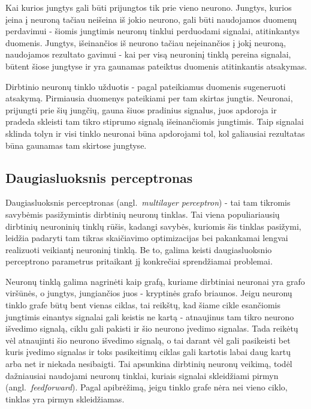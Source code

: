 \documentclass{VUMIFPSbakalaurinis}
\begin{document}
Kai kurios jungtys gali būti prijungtos tik prie vieno neurono.
Jungtys, kurios įeina į neuroną tačiau neišeina iš jokio neurono, gali būti naudojamos duomenų perdavimui - šiomis jungtimis neuronų tinklui perduodami signalai, atitinkantys duomenis.
Jungtys, išeinančios iš neurono tačiau neįeinančios į jokį neuroną, naudojamos rezultato gavimui - kai per visą neuroninį tinklą pereina signalai, būtent šiose jungtyse ir yra gaunamas pateiktus duomenis atitinkantis atsakymas.

Dirbtinio neuronų tinklo užduotis - pagal pateikiamus duomenis sugeneruoti atsakymą.
Pirmiausia duomenys pateikiami per tam skirtas jungtis.
Neuronai, prijungti prie šių jungčių, gauna šiuos pradinius signalus, juos apdoroja ir pradeda skleisti tam tikro stiprumo signalą išeinančiomis jungtimis.
Taip signalai sklinda tolyn ir visi tinklo neuronai būna apdorojami tol, kol galiausiai rezultatas būna gaunamas tam skirtose jungtyse.



\subsection{Daugiasluoksnis perceptronas}

Daugiasluoksnis perceptronas (angl.~\textit{multilayer perceptron}) - tai tam tikromis savybėmis pasižymintis dirbtinių neuronų tinklas.
Tai viena populiariausių dirbtinių neuroninių tinklų rūšis, kadangi savybės, kuriomis šis tinklas pasižymi, leidžia padaryti tam tikras skaičiavimo optimizacijas bei pakankamai lengvai realizuoti veikiantį neuroninį tinklą.
Be to, galima keisti daugiasluoksnio perceptrono parametrus pritaikant jį konkrečiai sprendžiamai problemai.

Neuronų tinklą galima nagrinėti kaip grafą, kuriame dirbtiniai neuronai yra grafo viršūnės, o jungtys, jungiančios juos - kryptinės grafo briaunos.
Jeigu neuronų tinklo grafe būtų bent vienas ciklas, tai reikštų, kad šiame cikle esančiomis jungtimis einantys signalai gali keistis ne kartą - atnaujinus tam tikro neurono išvedimo signalą, ciklu gali pakisti ir šio neurono įvedimo signalas.
Tada reikėtų vėl atnaujinti šio neurono išvedimo signalą, o tai darant vėl gali pasikeisti bet kuris įvedimo signalas ir toks pasikeitimų ciklas gali kartotis labai daug kartų arba net ir niekada nesibaigti.
Tai apsunkina dirbtinių neuronų veikimą, todėl dažniausiai naudojami neuronų tinklai, kuriais signalai skleidžiami pirmyn (angl.~\textit{feedforward}).
Pagal apibrėžimą, jeigu tinklo grafe nėra nei vieno ciklo, tinklas yra pirmyn skleidžiamas.
\end{document}
